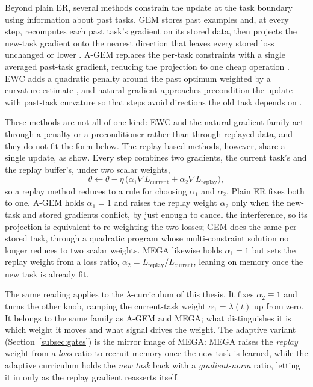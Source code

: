 Beyond plain ER, several methods constrain the update at the task boundary using information about past tasks. GEM stores past examples and, at every step, recomputes each past task's gradient on its stored data, then projects the new-task gradient onto the nearest direction that leaves every stored loss unchanged or lower \cite{lopezpaz2022gradientepisodicmemorycontinual}. A-GEM replaces the per-task constraints with a single averaged past-task gradient, reducing the projection to one cheap operation \cite{chaudhry2019efficientlifelonglearningagem}. EWC adds a quadratic penalty around the past optimum weighted by a curvature estimate \cite{Kirkpatrick_2017}, and natural-gradient approaches precondition the update with past-task curvature so that steps avoid directions the old task depends on \cite{kao2021naturalcontinuallearningsuccess}.

These methods are not all of one kind: EWC and the natural-gradient family act through a penalty or a preconditioner rather than through replayed data, and they do not fit the form below. The replay-based methods, however, share a single update, as \citet{sodhani2022introductionlifelongsupervisedlearning} show. Every step combines two gradients, the current task's and the replay buffer's, under two scalar weights,
\begin{equation}
    \theta \leftarrow \theta - \eta\,\big(\alpha_1 \nabla L_{\text{current}} + \alpha_2 \nabla L_{\text{replay}}\big),
    \label{eq:unified_update}
\end{equation}
so a replay method reduces to a rule for choosing $\alpha_1$ and $\alpha_2$. Plain ER fixes both to one. A-GEM holds $\alpha_1 = 1$ and raises the replay weight $\alpha_2$ only when the new-task and stored gradients conflict, by just enough to cancel the interference, so its projection is equivalent to re-weighting the two losses; GEM does the same per stored task, through a quadratic program whose multi-constraint solution no longer reduces to two scalar weights. MEGA \citep{guo2020improvedschemesepisodicmemorybased} likewise holds $\alpha_1 = 1$ but sets the replay weight from a loss ratio, $\alpha_2 = L_{\text{replay}}/L_{\text{current}}$, leaning on memory once the new task is already fit.

The same reading applies to the $\lambda$-curriculum of this thesis. It fixes $\alpha_2 \equiv 1$ and turns the other knob, ramping the current-task weight $\alpha_1 = \lambda(t)$ up from zero. It belongs to the same family as A-GEM and MEGA; what distinguishes it is which weight it moves and what signal drives the weight. The adaptive variant (Section~\ref{subsec:gates}) is the mirror image of MEGA: MEGA raises the \emph{replay} weight from a \emph{loss} ratio to recruit memory once the new task is learned, while the adaptive curriculum holds the \emph{new task} back with a \emph{gradient-norm} ratio, letting it in only as the replay gradient reasserts itself.

